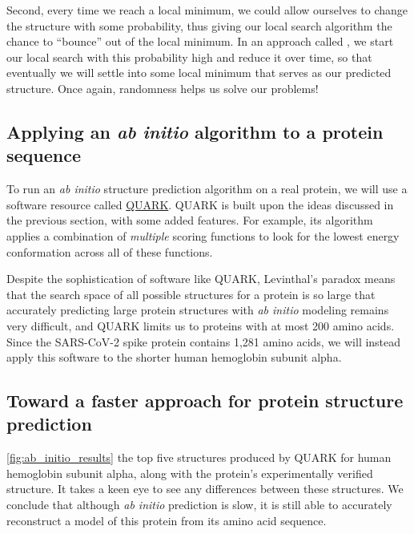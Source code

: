Second, every time we reach a local minimum, we could allow ourselves to change the structure with some probability, thus giving our local search algorithm the chance to ``bounce'' out of the local minimum. In an approach called , we start our local search with this probability high and reduce it over time, so that eventually we will settle into some local minimum that serves as our predicted structure. Once again, randomness helps us solve our problems!

\FloatBarrier
{}
\subsection{Applying an \textit{ab initio} algorithm to a protein sequence}

To run an \textit{ab initio} structure prediction algorithm on a real protein, we will use a software resource called \href{https://zhanglab.ccmb.med.umich.edu/QUARK/}{QUARK}. QUARK is built upon the ideas discussed in the previous section, with some added features. For example, its algorithm applies a combination of \textit{multiple} scoring functions to look for the lowest energy conformation across all of these functions.

Despite the sophistication of software like QUARK, Levinthal's paradox means that the search space of all possible structures for a protein is so large that accurately predicting large protein structures with \textit{ab initio} modeling remains very difficult, and QUARK limits us to proteins with at most 200 amino acids. Since the SARS-CoV-2 spike protein contains 1,281 amino acids, we will instead apply this software to the shorter human hemoglobin subunit alpha. 

\FloatBarrier
{}
\subsection{Toward a faster approach for protein structure prediction}

\autoref{fig:ab_initio_results} the top five structures produced by QUARK for human hemoglobin subunit alpha, along with the protein's experimentally verified structure. It takes a keen eye to see any differences between these structures. We conclude that although \textit{ab initio} prediction is slow, it is still able to accurately reconstruct a model of this protein from its amino acid sequence.\\

